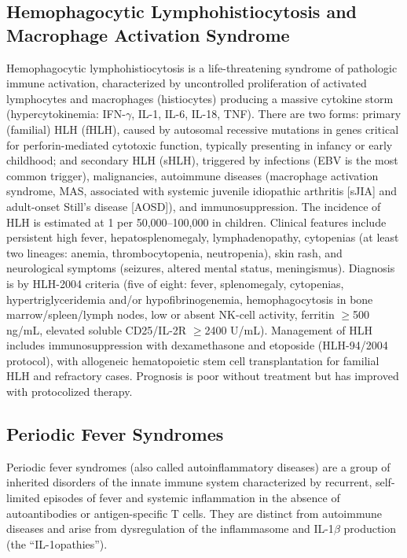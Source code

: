 \subsection{Hemophagocytic Lymphohistiocytosis and Macrophage Activation Syndrome}
\label{sec:Hemophagocytic Lymphohistiocytosis (HLH)}
Hemophagocytic lymphohistiocytosis is a life-threatening syndrome of pathologic immune activation, characterized by uncontrolled proliferation of activated lymphocytes and macrophages (histiocytes) producing a massive cytokine storm (hypercytokinemia: IFN-$\gamma$, IL-1, IL-6, IL-18, TNF). There are two forms: primary (familial) HLH (fHLH), caused by autosomal recessive mutations in genes critical for perforin-mediated cytotoxic function, typically presenting in infancy or early childhood; and secondary HLH (sHLH), triggered by infections (EBV is the most common trigger), malignancies, autoimmune diseases (macrophage activation syndrome, MAS, associated with systemic juvenile idiopathic arthritis [sJIA] and adult-onset Still's disease [AOSD]), and immunosuppression. The incidence of HLH is estimated at 1 per 50,000--100,000 in children. Clinical features include persistent high fever, hepatosplenomegaly, lymphadenopathy, cytopenias (at least two lineages: anemia, thrombocytopenia, neutropenia), skin rash, and neurological symptoms (seizures, altered mental status, meningismus). Diagnosis is by HLH-2004 criteria (five of eight: fever, splenomegaly, cytopenias, hypertriglyceridemia and/or hypofibrinogenemia, hemophagocytosis in bone marrow/spleen/lymph nodes, low or absent NK-cell activity, ferritin $\geq$500 ng/mL, elevated soluble CD25/IL-2R $\geq$2400 U/mL). Management of HLH includes immunosuppression with dexamethasone and etoposide (HLH-94/2004 protocol), with allogeneic hematopoietic stem cell transplantation for familial HLH and refractory cases. Prognosis is poor without treatment but has improved with protocolized therapy.

\subsection{Periodic Fever Syndromes}
\label{sec:Periodic Fever Syndromes}
Periodic fever syndromes (also called autoinflammatory diseases) are a group of inherited disorders of the innate immune system characterized by recurrent, self-limited episodes of fever and systemic inflammation in the absence of autoantibodies or antigen-specific T cells. They are distinct from autoimmune diseases and arise from dysregulation of the inflammasome and IL-1$\beta$ production (the ``IL-1opathies'').

